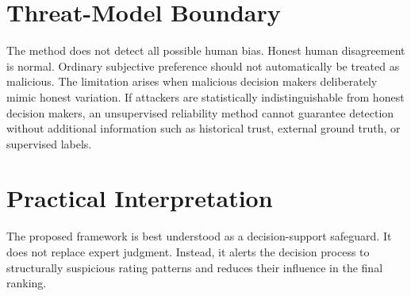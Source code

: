 \section{Threat-Model Boundary}
The method does not detect all possible human bias. Honest human disagreement is normal. Ordinary subjective preference should not automatically be treated as malicious. The limitation arises when malicious decision makers deliberately mimic honest variation. If attackers are statistically indistinguishable from honest decision makers, an unsupervised reliability method cannot guarantee detection without additional information such as historical trust, external ground truth, or supervised labels.

\section{Practical Interpretation}
The proposed framework is best understood as a decision-support safeguard. It does not replace expert judgment. Instead, it alerts the decision process to structurally suspicious rating patterns and reduces their influence in the final ranking.
